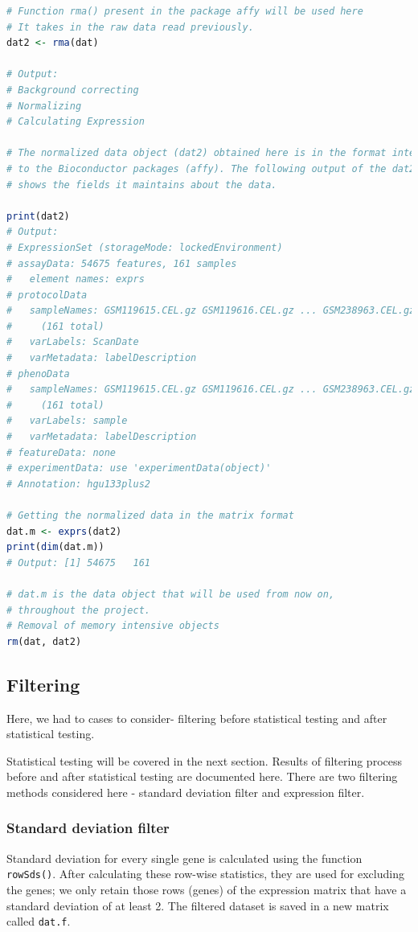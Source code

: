 \documentclass[oneside, a4paper, 11pt]{book}
\begin{document}
\begin{lstlisting}[language=R, caption=Data Normalization]
# Function rma() present in the package affy will be used here
# It takes in the raw data read previously.
dat2 <- rma(dat)

# Output:
# Background correcting
# Normalizing
# Calculating Expression

# The normalized data object (dat2) obtained here is in the format internal
# to the Bioconductor packages (affy). The following output of the dat2
# shows the fields it maintains about the data.

print(dat2)
# Output:
# ExpressionSet (storageMode: lockedEnvironment)
# assayData: 54675 features, 161 samples 
#   element names: exprs 
# protocolData
#   sampleNames: GSM119615.CEL.gz GSM119616.CEL.gz ... GSM238963.CEL.gz
#     (161 total)
#   varLabels: ScanDate
#   varMetadata: labelDescription
# phenoData
#   sampleNames: GSM119615.CEL.gz GSM119616.CEL.gz ... GSM238963.CEL.gz
#     (161 total)
#   varLabels: sample
#   varMetadata: labelDescription
# featureData: none
# experimentData: use 'experimentData(object)'
# Annotation: hgu133plus2

# Getting the normalized data in the matrix format
dat.m <- exprs(dat2)
print(dim(dat.m))
# Output: [1] 54675   161

# dat.m is the data object that will be used from now on,
# throughout the project.
# Removal of memory intensive objects
rm(dat, dat2)
\end{lstlisting}

\subsection{Filtering}
Here, we had to cases to consider- filtering before statistical testing and after statistical testing.

Statistical testing will be covered in the next section. Results of filtering process before and after statistical testing are documented here. There are two filtering methods considered here - standard deviation filter and expression filter. 

\subsubsection{Standard deviation filter}
Standard deviation for every single gene is calculated using the function \texttt{rowSds()}. After calculating these row-wise statistics, they are used for excluding the genes; we only retain those rows (genes) of the expression matrix that have a standard deviation of at least 2. The filtered dataset is saved in a new matrix called \texttt{dat.f}.
\end{document}
